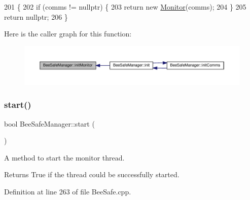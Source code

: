 \begin{DoxyCode}
201 \{
202     \textcolor{keywordflow}{if} (comms != \textcolor{keyword}{nullptr}) \{
203         \textcolor{keywordflow}{return} \textcolor{keyword}{new} \hyperlink{class_monitor}{Monitor}(comms);
204     \}
205     \textcolor{keywordflow}{return} \textcolor{keyword}{nullptr};
206 \}
\end{DoxyCode}
Here is the caller graph for this function\+:
\nopagebreak
\begin{figure}[H]
\begin{center}
\leavevmode
\includegraphics[width=350pt]{d5/d75/class_bee_safe_manager_ad30babe45ead2cb6a5b0559afa5bc5ff_icgraph}
\end{center}
\end{figure}
\mbox{\label{class_bee_safe_manager_a7242d89761621de0e09ec9ea360fca27}} 
\subsubsection{\texorpdfstring{start()}{start()}}
{\footnotesize\ttfamily bool Bee\+Safe\+Manager\+::start (\begin{DoxyParamCaption}{ }\end{DoxyParamCaption})}

A method to start the monitor thread.

\begin{DoxyReturn}{Returns}
True if the thread could be successfully started. 
\end{DoxyReturn}


Definition at line 263 of file Bee\+Safe.\+cpp.


